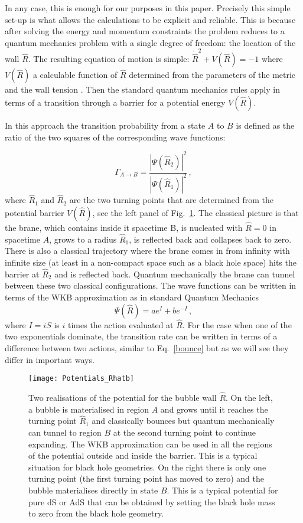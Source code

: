 \documentclass[a4paper,11pt]{article}
\numberwithin{equation}{section}
\newcommand{\be}{\begin{equation}}
\newcommand{\ee}{\end{equation}}
\numberwithin{equation}{section}
\begin{document}
In any case, this is enough for our purposes in this paper. Precisely this simple set-up is what allows the calculations to be explicit and reliable. This is because after solving the energy and momentum constraints the problem reduces to a quantum mechanics problem with a single degree of freedom: the location of the wall $\hat R$. The resulting equation of motion is simple: $\dot{\hat R}^2 +V(\hat R)=-1$ where $V(\hat R)$ a calculable function of $\hat R$ determined from the parameters of the metric and the wall tension \cite {Blau:1986cw}. Then the standard quantum mechanics rules apply in terms of a transition through a barrier for a potential energy $V(\hat R)$.
\vskip 1mm

In this approach the transition probability from a state $A$ to $B$ is defined as the ratio of the two squares of the corresponding wave functions:
 
 \be
 \Gamma_{A\rightarrow B}=\frac{|\Psi(\hat R_2)|^2}{|\Psi(\hat R_1)|^2} \,,
 \ee
where $\hat R_1$ and $\hat R_2$ are the two turning points that are determined from the potential barrier $V(\hat R)$, see the left panel of Fig.~\ref{fig:potentialRhat}. The classical picture is that the brane, which contains inside it spacetime B, is nucleated with $\hat R = 0$ in spacetime $A$, grows to a radius $\hat{R}_1$, is reflected back and collapses back to zero. There is also a classical trajectory where the brane comes in from infinity with infinite size (at least in a non-compact space such as a black hole space) hits the barrier at $\hat{R}_2$ and is reflected back. Quantum mechanically the brane can tunnel between these two classical configurations. The wave functions can be written in terms of the WKB approximation as in standard Quantum Mechanics
\be
\Psi(\hat R)=a e^I +b e^{-I} \,,
\ee
where $I=iS$ is $i$ times the action evaluated at  $\hat R$. For the case when one of the two exponentials dominate, the transition rate can be written in terms of a difference between two actions, similar to Eq.~\eqref{bounce} but as we will see they differ in important ways.

\begin{figure}[h!] 
\begin{center} 
\texttt{[image: Potentials\_Rhatb]}
\caption{\footnotesize{Two realisations of the potential for the bubble wall $\hat R$. On the left, a bubble is materialised in region $A$ and grows until it reaches the turning point $\hat R_1$ and classically bounces but quantum mechanically can tunnel to region $B$ at the second turning point to continue expanding. The  WKB approximation can be used in all the regions of the potential outside and inside the barrier. This is a typical situation for black hole geometries. On the right there is only one turning point (the first turning point has moved to zero) and the bubble materialises directly in state $B$. This is a typical potential for pure dS or AdS that can be obtained by setting the black hole mass to zero from the black hole geometry.} \label{fig:potentialRhat}}
\end{center} 
\end{figure}
\end{document}

